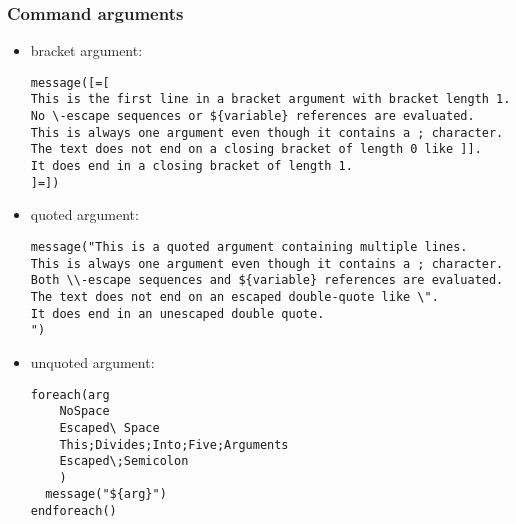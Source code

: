 \subsubsection{Command arguments}
\begin{itemize}
    \item bracket argument:\begin{lstlisting}
message([=[
This is the first line in a bracket argument with bracket length 1.
No \-escape sequences or ${variable} references are evaluated.
This is always one argument even though it contains a ; character.
The text does not end on a closing bracket of length 0 like ]].
It does end in a closing bracket of length 1.
]=])
\end{lstlisting}

    \item quoted argument:\begin{lstlisting}
message("This is a quoted argument containing multiple lines.
This is always one argument even though it contains a ; character.
Both \\-escape sequences and ${variable} references are evaluated.
The text does not end on an escaped double-quote like \".
It does end in an unescaped double quote.
")
\end{lstlisting}

    \item unquoted argument: \begin{lstlisting}
foreach(arg
    NoSpace
    Escaped\ Space
    This;Divides;Into;Five;Arguments
    Escaped\;Semicolon
    )
  message("${arg}")
endforeach()
\end{lstlisting}
\end{itemize}


